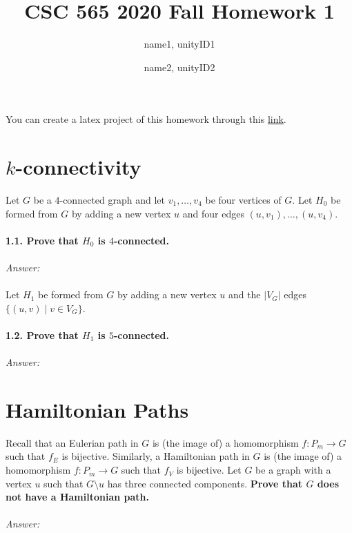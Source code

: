 \documentclass{article}
\title{CSC 565 2020 Fall Homework 1}
\author{    
    name1, unityID1 \\
    \and
    name2, unityID2 
}
\begin{document}
  \maketitle
  
  You can create a latex project of this homework through this \href{https://www.overleaf.com/docs?snip_uri=https://donsheehy.github.io/graphtheoryhomework/hw1.tex}{link}.

  \section{$k$-connectivity}
    Let $G$ be a $4$-connected graph and let $v_1,\ldots, v_4$ be four vertices of $G$.
    Let $H_0$ be formed from $G$ by adding a new vertex $u$ and four edges $(u,v_1), \ldots , (u,v_4)$.
    \\\\
    \textbf{1.1. Prove that $H_0$ is $4$-connected.}
    \\\\
    \textit{Answer:}
    \\\\
    
    Let $H_1$ be formed from $G$ by adding a new vertex $u$ and the $|V_G|$ edges $\{(u,v) \mid v\in V_G\}$.
    \\\\
    \textbf{1.2. Prove that $H_1$ is $5$-connected.}
    \\\\
    \textit{Answer:}
    

  \section{Hamiltonian Paths}
  Recall that an Eulerian path in $G$ is (the image of) a homomorphism $f:P_m\to G$ such that $f_E$ is bijective.
  Similarly, a Hamiltonian path in $G$ is (the image of) a homomorphism $f:P_m\to G$ such that $f_V$ is bijective.
  Let $G$ be a graph with a vertex $u$ such that $G\setminus u$ has three connected components.
  \textbf{Prove that $G$ does not have a Hamiltonian path.}
  \\\\
  \textit{Answer:}
    
\end{document}
